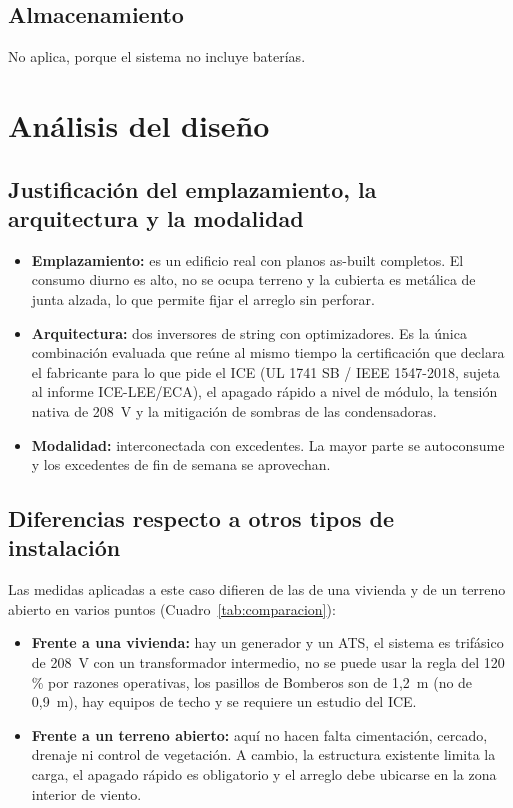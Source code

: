 \documentclass[12pt]{article}
\begin{document}
\subsection{Almacenamiento}
No aplica, porque el sistema no incluye baterías.

\section{Análisis del diseño}
\subsection{Justificación del emplazamiento, la arquitectura y la modalidad}
\begin{itemize}
\item \textbf{Emplazamiento:} es un edificio real con planos as-built completos. El consumo diurno es alto, no se ocupa terreno y la cubierta es metálica de junta alzada, lo que permite fijar el arreglo sin perforar.
\item \textbf{Arquitectura:} dos inversores de string con optimizadores. Es la única combinación evaluada que reúne al mismo tiempo la certificación que declara el fabricante para lo que pide el ICE (UL 1741 SB / IEEE 1547-2018, sujeta al informe ICE-LEE/ECA), el apagado rápido a nivel de módulo, la tensión nativa de 208~V y la mitigación de sombras de las condensadoras.
\item \textbf{Modalidad:} interconectada con excedentes. La mayor parte se autoconsume y los excedentes de fin de semana se aprovechan.
\end{itemize}

\subsection{Diferencias respecto a otros tipos de instalación}
Las medidas aplicadas a este caso difieren de las de una vivienda y de un terreno abierto en varios puntos (Cuadro~\ref{tab:comparacion}):
\begin{itemize}
\item \textbf{Frente a una vivienda:} hay un generador y un ATS, el sistema es trifásico de 208~V con un transformador intermedio, no se puede usar la regla del 120\,\% por razones operativas, los pasillos de Bomberos son de 1,2~m (no de 0,9~m), hay equipos de techo y se requiere un estudio del ICE.
\item \textbf{Frente a un terreno abierto:} aquí no hacen falta cimentación, cercado, drenaje ni control de vegetación. A cambio, la estructura existente limita la carga, el apagado rápido es obligatorio y el arreglo debe ubicarse en la zona interior de viento.
\end{itemize}
\end{document}
